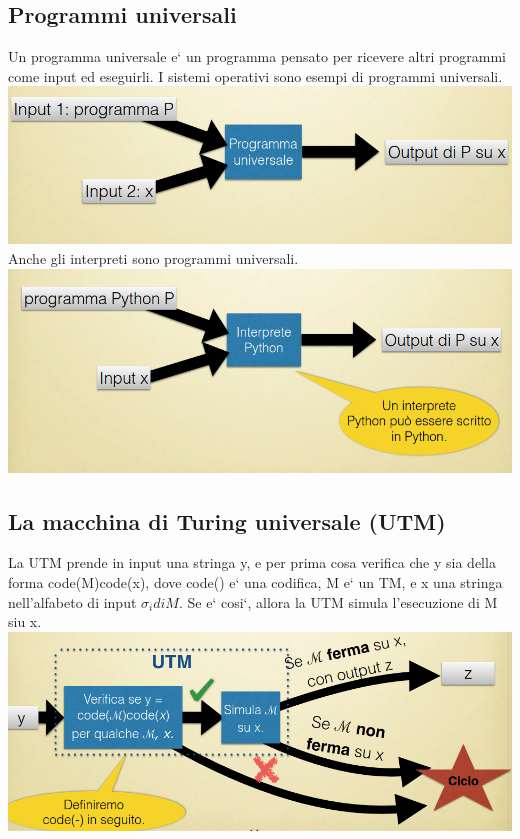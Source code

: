 \documentclass[a4paper, 12pt]{article}
\begin{document}
\subsection{Programmi universali} 
Un programma universale e` un programma pensato per ricevere altri programmi come input ed eseguirli. I sistemi operativi sono esempi di programmi universali.\\
\includegraphics[scale=0.5]{programmi_universali.png}
Anche gli interpreti sono programmi universali.\\
\includegraphics[scale=0.5]{interpreti_programmi_universali.png}
\subsection{La macchina di Turing universale (UTM)}
La UTM prende in input una stringa y, e per prima cosa verifica che y sia della forma code(M)code(x), dove code() e` una codifica, M e` un TM, e x una stringa nell'alfabeto di input \(\sigma_i di M.\)
Se e` cosi`, allora la UTM simula l'esecuzione di M siu x.\\ \includegraphics[scale=0.5]{UTM.png}
\end{document}
